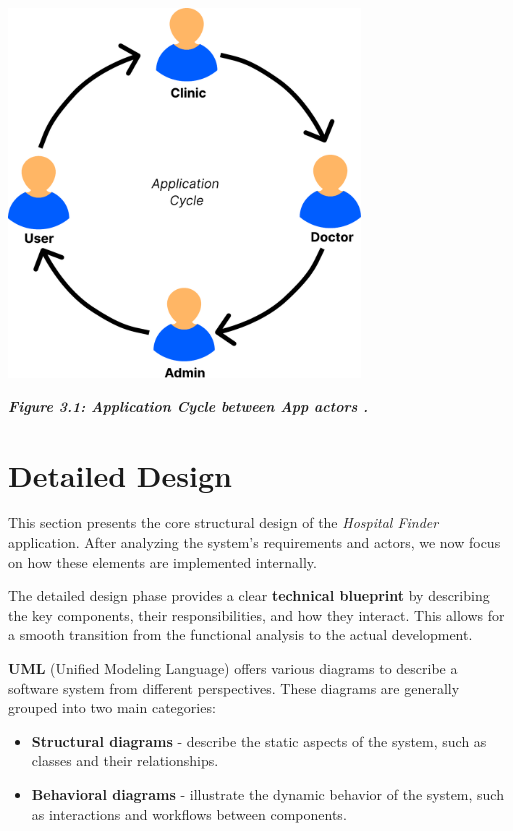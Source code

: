 \documentclass[12pt]{report}
\begin{document}
\vspace*{0.6cm}
\begin{center}
	\includegraphics[width=0.7\textwidth]{images/AppCycle.pdf}
\end{center}
\vspace{0.1cm}
\begin{center}
	\textit{\textbf{Figure 3.1: Application Cycle between App actors .}}
\end{center}
\vspace{0.5cm}

\section{Detailed Design}

This section presents the core structural design of the \textit{Hospital Finder} application. After analyzing the system’s requirements and actors, we now focus on how these elements are implemented internally.

\noindent The detailed design phase provides a clear \textbf{technical blueprint} by describing the key components, their responsibilities, and how they interact. This allows for a smooth transition from the functional analysis to the actual development.

\noindent \textbf{UML} (Unified Modeling Language) offers various diagrams to describe a software system from different perspectives. These diagrams are generally grouped into two main categories:


\begin{itemize}
	\item \textbf{Structural diagrams} - describe the static aspects of the system, such as classes and their relationships.
	\item \textbf{Behavioral diagrams} - illustrate the dynamic behavior of the system, such as interactions and workflows between components.
\end{itemize}
\end{document}
